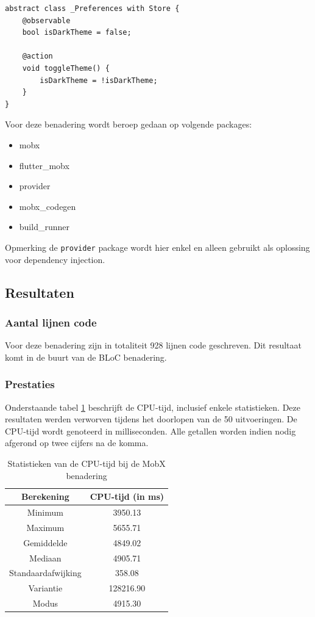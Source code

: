 \begin{verbatim}
abstract class _Preferences with Store {
    @observable
    bool isDarkTheme = false;

    @action
    void toggleTheme() {
        isDarkTheme = !isDarkTheme;
    }
}
\end{verbatim}

Voor deze benadering wordt beroep gedaan op volgende packages: 
\begin{itemize}
    \item{mobx}
    \item{flutter\_mobx}
    \item{provider}
    \item{mobx\_codegen}
    \item{build\_runner}
\end{itemize}
Opmerking de \verb|provider| package wordt hier enkel en alleen gebruikt als oplossing voor dependency injection.

\subsection{Resultaten}
\subsubsection{Aantal lijnen code}
Voor deze benadering zijn in totaliteit 928 lijnen code geschreven. Dit resultaat komt in de buurt van de BLoC benadering.
\subsubsection{Prestaties}
Onderstaande tabel \ref{table:experiment-mobx-statistics} beschrijft de CPU-tijd, inclusief enkele statistieken. Deze resultaten werden verworven tijdens het doorlopen van de 50 uitvoeringen. De CPU-tijd wordt genoteerd in milliseconden. Alle getallen worden indien nodig afgerond op twee cijfers na de komma.
\begin{table}[H]
    \centering
    \begin{tabular}{c|c}
        \textbf{Berekening} & \textbf{CPU-tijd (in ms)}  \\ \hline
        Minimum             & 3950.13                    \\ \hline
        Maximum             & 5655.71                    \\ \hline
        Gemiddelde          & 4849.02                    \\ \hline
        Mediaan             & 4905.71                    \\ \hline
        Standaardafwijking  & 358.08                     \\ \hline
        Variantie           & 128216.90                  \\ \hline
        Modus               & 4915.30                    \\                
    \end{tabular}
    \caption{Statistieken van de CPU-tijd bij de MobX benadering}
    \label{table:experiment-mobx-statistics}
\end{table}


